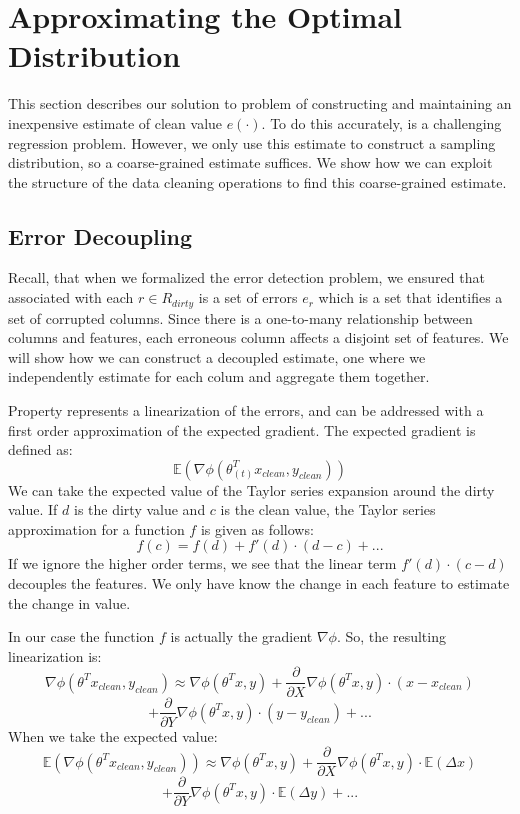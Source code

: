 \section{Approximating the Optimal Distribution}
This section describes our solution to problem of constructing and maintaining an inexpensive estimate of clean value $e(\cdot)$.
To do this accurately, is a challenging regression problem.
However, we only use this estimate to construct a sampling distribution, so a coarse-grained estimate suffices.
We show how we can exploit the structure of the data cleaning operations to find this coarse-grained estimate.

\subsection{Error Decoupling}
Recall, that when we formalized the error detection problem, we ensured that associated with each $r \in R_{dirty}$ is a set of errors $e_r$ which is a set that identifies a set of corrupted columns.
Since there is a one-to-many relationship between columns and features, each erroneous column affects a disjoint set of features.
We will show how we can construct a decoupled estimate, one where we independently estimate for each colum and aggregate them together.

Property represents a linearization of the errors, and can be addressed with a first order approximation of the expected gradient.
The expected gradient is defined as:
\[
\mathbb{E}(\nabla\phi(\theta_{(t)}^Tx_{clean},y_{clean}))
\]
We can take the expected value of the Taylor series expansion around the dirty value.
If $d$ is the dirty value and $c$ is the clean value, the Taylor series approximation for a function $f$ is given as follows:
\[
f(c) = f(d) + f'(d)\cdot(d-c) + ...
\]
If we ignore the higher order terms, we see that the linear term $f'(d)\cdot(c-d)$ decouples the features.
We only have know the change in each feature to estimate the change in value.

In our case the function $f$ is actually the gradient $\nabla\phi$.
So, the resulting linearization is:
\[
\nabla\phi(\theta^Tx_{clean},y_{clean}) \approx \nabla\phi(\theta^Tx,y) + \frac{\partial}{\partial X}\nabla\phi(\theta^Tx,y)\cdot (x - x_{clean}) \]
\[+ \frac{\partial}{\partial Y}\nabla\phi(\theta^Tx,y)\cdot (y - y_{clean}) + ...
\]
When we take the expected value:
\[
\mathbb{E}(\nabla\phi(\theta^Tx_{clean},y_{clean})) \approx \nabla\phi(\theta^Tx,y) + \frac{\partial}{\partial X}\nabla\phi(\theta^Tx,y)\cdot \mathbb{E}(\Delta x) \]
\[+ \frac{\partial}{\partial Y}\nabla\phi(\theta^Tx,y)\cdot \mathbb{E}(\Delta y) + ...
\]

